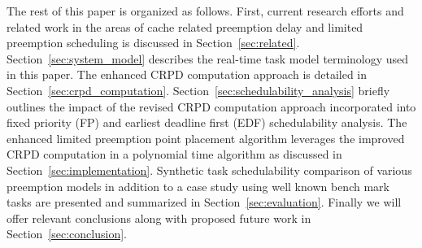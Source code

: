 The rest of this paper is organized as follows. First, current research efforts and related work in the areas of cache related preemption delay and limited preemption scheduling is discussed in Section~\ref{sec:related}.  Section~\ref{sec:system_model} describes the real-time task model terminology used in this paper.  The enhanced CRPD computation approach is detailed in Section~\ref{sec:crpd_computation}. Section~\ref{sec:schedulability_analysis} briefly outlines the impact of the revised CRPD computation approach incorporated into fixed priority (FP) and earliest deadline first (EDF) schedulability analysis.  The enhanced limited preemption point placement algorithm leverages the improved CRPD computation in a polynomial time algorithm as discussed in Section~\ref{sec:implementation}.  Synthetic task schedulability comparison of various preemption models in addition to a case study using well known bench mark tasks are presented and summarized in Section~\ref{sec:evaluation}.  Finally we will offer relevant conclusions along with proposed future work in Section~\ref{sec:conclusion}. 